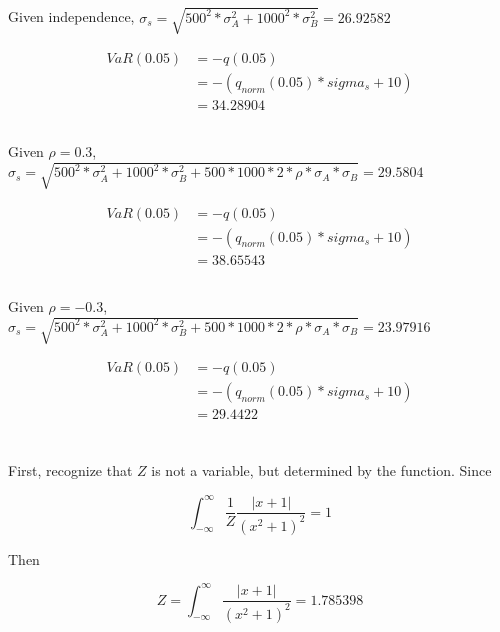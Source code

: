 \documentclass[11pt]{scrartcl}
\begin{document}
\subsection{}

Given independence, $\sigma_s = \sqrt{500^2*\sigma_A^2 + 1000^2*\sigma_B^2} = 26.92582$

\begin{align*}
VaR(0.05) &= -q(0.05) \\
&= -(q_{norm}(0.05) * sigma_s + 10) \\
&= 34.28904
\end{align*}

\subsection{}

Given $\rho = 0.3$, $\sigma_s = \sqrt{500^2*\sigma_A^2 + 1000^2*\sigma_B^2 + 500*1000*2 * \rho * \sigma_A * \sigma_B} = 29.5804$

\begin{align*}
VaR(0.05) &= -q(0.05) \\
&= -(q_{norm}(0.05) * sigma_s + 10) \\
&= 38.65543
\end{align*}

\subsection{}

Given $\rho = -0.3$, $\sigma_s = \sqrt{500^2*\sigma_A^2 + 1000^2*\sigma_B^2 + 500*1000*2 * \rho * \sigma_A * \sigma_B} = 23.97916$

\begin{align*}
VaR(0.05) &= -q(0.05) \\
&= -(q_{norm}(0.05) * sigma_s + 10) \\
&= 29.4422
\end{align*}

\section{}

First, recognize that $Z$ is not a variable, but determined by the function. Since

\[\int_{-\infty}^{\infty} \frac{1}{Z} \frac{|x+1|}{(x^2+1)^2} = 1\]

Then

\[Z = \int_{-\infty}^{\infty} \frac{|x+1|}{(x^2+1)^2} = 1.785398\]
\end{document}
